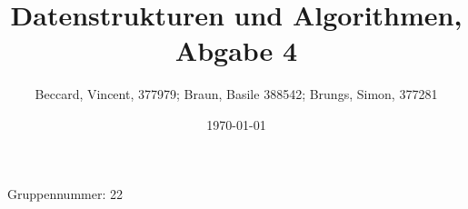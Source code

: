 \documentclass{article}
\title{Datenstrukturen und Algorithmen, Abgabe 4}
\author{Beccard, Vincent, 377979; Braun, Basile 388542; Brungs, Simon, 377281}
\date{\today}
\begin{document}
\noindent
Gruppennummer: 22%
\begingroup
\let\newpage\relax%
\maketitle
\endgroup
\renewcommand{\thesubsection}{\alph{subsection}}




\end{document}
